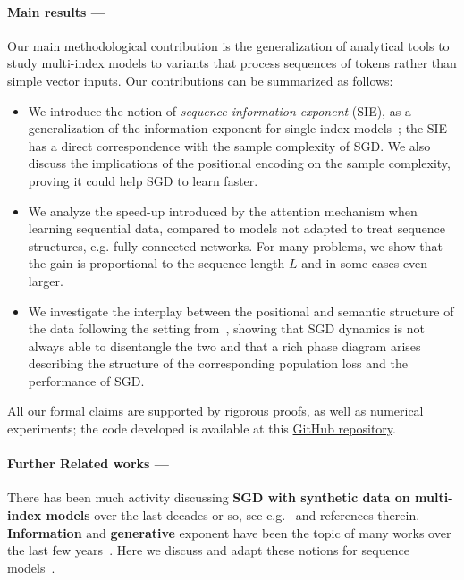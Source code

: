 \paragraph{Main results ---} Our main methodological contribution is the generalization of analytical tools to study multi-index models to variants that process sequences of tokens rather than simple vector inputs. Our contributions can be summarized as follows:
\begin{itemize}
    \item We introduce the notion of \emph{sequence information exponent} (SIE), as a generalization of the information exponent for single-index models~\cite{arous2021online}; the SIE has a direct correspondence with the sample complexity of SGD. We also discuss the implications of the positional encoding on the sample complexity, proving it could help SGD to learn faster.
    \item We analyze the speed-up introduced by the attention mechanism when learning sequential data, compared to models  not adapted to treat sequence structures, e.g. fully connected networks. For many problems, we show that the gain is proportional to the sequence length \(L\) and in some cases even larger. 
    \item We investigate the interplay between the positional  and semantic structure of the data following the setting from~\cite{cui2024phase}, showing that SGD dynamics is not always able to disentangle the two and that a rich phase diagram arises describing the structure of the corresponding population loss and the performance of SGD. 
\end{itemize}
All our formal claims are supported by rigorous proofs, as well as numerical experiments; the code developed is available at this \href{https://github.com/IdePHICS/Sequence-Single-Index}{GitHub repository}.

\paragraph{Further Related works ---} There has been much activity discussing {\bf SGD with synthetic data on multi-index models} over the last decades or so, see e.g.~\citep{arous2021online,veiga2022phase,arnaboldi2023high,collinswoodfin2023hitting,marion2023leveraging,berthier2023learning,montanari2025dynamical} and references therein. {\bf Information} and  {\bf generative} exponent have been the topic of many works over the last few years~\citep{arous2021online,abbe2022merged,damian2024computational,troiani2024fundamental,defilippis2025optimal}. Here we discuss and adapt these notions for sequence models~\cite{troiani2025fundamental}.

